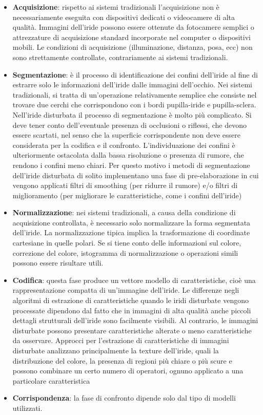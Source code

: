 \begin{itemize}
    \item \textbf{Acquisizione}: rispetto ai sistemi tradizionali l'acquisizione non è necessariamente eseguita con dispositivi dedicati o videocamere di alta qualità. Immagini dell'iride possono essere ottenute da fotocamere semplici o attrezzature di acquisizione standard incorporate nel computer o dispositivi mobili. Le condizioni di acquisizione (illuminazione, distanza, posa, ecc) non sono strettamente controllate, contrariamente ai sistemi tradizionali.
    \item  \textbf{Segmentazione}: è il processo di identificazione dei confini dell'iride al fine di estrarre solo le informazioni dell'iride dalle immagini dell'occhio. Nei sistemi tradizionali, si tratta di un'operazione relativamente semplice che consiste nel trovare due cerchi che corrispondono con i bordi pupilla-iride e pupilla-sclera.
    Nell'iride disturbata il processo di segmentazione è molto più complicato. Si deve tener conto dell’eventuale presenza di occlusioni o riflessi, che devono essere scartati, nel senso che la superficie corrispondente non deve essere considerata per la codifica e il confronto. L'individuazione dei confini è ulteriormente ostacolata dalla bassa risoluzione o presenza di rumore, che rendono i confini meno chiari. Per questo motivo i metodi di segmentazione dell'iride disturbata di solito implementano una fase di pre-elaborazione in cui vengono applicati filtri di smoothing (per ridurre il rumore) e/o filtri di miglioramento (per migliorare le caratteristiche, come i confini dell'iride)
    \item \textbf{Normalizzazione}: nei sistemi tradizionali, a causa della condizione di acquisizione controllata, è necessario solo normalizzare la forma segmentata dell'iride. La normalizzazione tipica implica la trasformazione di coordinate cartesiane in quelle polari. Se si tiene conto delle informazioni sul colore, correzione del colore, istogramma di normalizzazione o operazioni simili possono essere risultare utili.
    \item \textbf{Codifica}: questa fase produce un vettore modello di caratteristiche, cioè una rappresentazione compatta di un'immagine dell'iride. Le differenze negli algoritmi di estrazione di caratteristiche quando le iridi disturbate vengono processate dipendono dal fatto che in immagini di alta qualità anche piccoli dettagli strutturali dell'iride sono facilmente visibili. Al contrario, le immagini disturbate possono presentare caratteristiche alterate o meno caratteristiche da osservare. Approcci per l'estrazione di caratteristiche di immagini disturbate analizzano principalmente la texture dell'iride, quali la distribuzione del colore, la presenza di regioni più chiare o più scure e possono combinare un certo numero di operatori, ognuno applicato a una particolare caratteristica
     \item \textbf{Corrispondenza}: la fase di confronto dipende solo dal tipo di modelli utilizzati.\cite{biometria}\newpage
\end{itemize}

